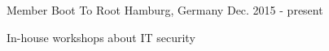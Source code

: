 

\begin{cventries}

  \cventry
    {Member} %
    {Boot To Root} %
    {Hamburg, Germany} %
    {Dec. 2015 - present} %
    {
      \begin{cvitems} %
        \item {In-house workshops about IT security}
      \end{cvitems}
    }

\end{cventries}
